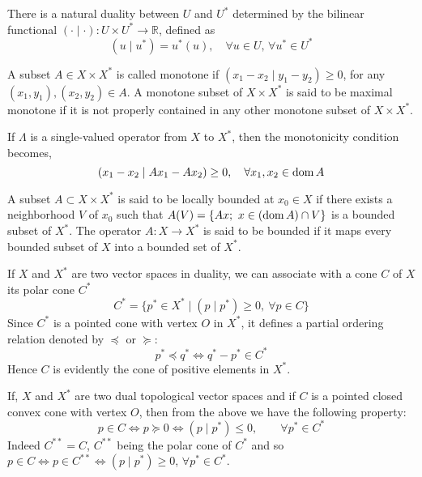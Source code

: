 \begin{remark}
	There is a natural duality between $U$ and $U^*$ determined by the bilinear functional $(\cdot \mid \cdot): U\times U^*\rightarrow \mathbb{R}$, defined as \[(u \mid u^*)=u^*(u), \quad \forall u \in U, \, \forall u^* \in U^*\]
\end{remark}



\begin{definition}
	A subset $A \in X\times X^*$ is called monotone if
	$(x_1 - x_2 \mid y_1 - y_2 ) \geq 0$, for any $(x_1, y_1), (x_2, y_2) \in A$. A monotone subset of $X\times X^*$ is said to be maximal monotone if it is not properly contained in any other monotone subset of $X\times X^*$.
	
	If $\Lambda$ is a single-valued operator from $X$ to $X^*$, then the monotonicity condition becomes,
	\[
	(x_1-x_2 \mid Ax_1-Ax_2)\geq 0, \quad \forall x_1, x_2 \in \mathrm{dom\,} A
	\]
	
\end{definition}

\begin{definition}
	\label{def4. locally bounded.}
	A subset $A \subset X \times X^*$ is said to be locally bounded at $x_0 \in X$ if there exists a neighborhood $V$ of $x_0$ such that $A(V) = \{Ax;\ x \in (\mathrm{dom\,} A) \cap V \}$ is a
	bounded subset of $X^*$. The operator $A: X \rightarrow X^*$ is said to be bounded if it maps every bounded subset of $X$ into a bounded set of $X^*$.
\end{definition}

\begin{remark}
	If $X$ and $X^*$ are two vector spaces in duality, we can associate with a cone $C$ of $X$ its polar cone $C^*$
	\[
	C^* =\{p^* \in X^* \mid (p \mid p^*) \geq 0, \ \forall p \in C\}
	\]
	Since $C^*$ is a pointed cone with vertex $O$ in $X^*$, it defines a partial ordering relation denoted by $\preceq$ or $\succeq$:
	\[
	p^* \preceq q^* \iff q^* -p^* \in C^*
	\]
	Hence $C$ is evidently the cone of positive elements in $X^*$.
	
	If, $X$ and $X^*$ are two dual topological vector spaces and if $C$ is a pointed closed convex cone with vertex $O$, then from the above we have the following property:
	\[
	p \in C \iff p \succeq 0 \iff (p \mid p^*)\leq 0, \qquad \forall p^* \in C^*
	\]
	Indeed $C^{**}=C$, $C^{**}$ being the polar cone of $C^*$ and so $p \in C \iff p \in C^{**} \iff (p\mid p^*) \geq 0$, $\forall p^* \in C^*$. 
\end{remark}

